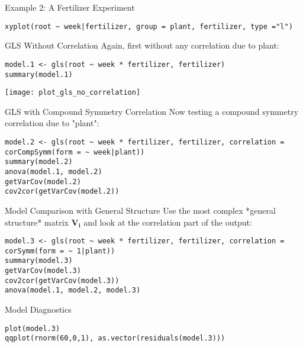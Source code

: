 \documentclass{beamer}
\begin{document}
\begin{frame}[fragile]{Example 2: A Fertilizer Experiment}
  \begin{verbatim}
xyplot(root ~ week|fertilizer, group = plant, fertilizer, type ="l")
  \end{verbatim}
\end{frame}

\begin{frame}[fragile]{GLS Without Correlation}
  Again, first without any correlation due to plant:
  \begin{verbatim}
model.1 <- gls(root ~ week * fertilizer, fertilizer)
summary(model.1)
  \end{verbatim}
  \begin{center}
    \texttt{[image: plot\_gls\_no\_correlation]} %
  \end{center}
\end{frame}

\begin{frame}[fragile]{GLS with Compound Symmetry Correlation}
  Now testing a compound symmetry correlation due to "plant":
  \begin{verbatim}
model.2 <- gls(root ~ week * fertilizer, fertilizer, correlation = corCompSymm(form = ~ week|plant))
summary(model.2)
anova(model.1, model.2)
getVarCov(model.2)
cov2cor(getVarCov(model.2))
  \end{verbatim}
\end{frame}

\begin{frame}[fragile]{Model Comparison with General Structure}
  Use the most complex *general structure* matrix $\mathbf{V_i}$ and look at the correlation part of the output:
  \begin{verbatim}
model.3 <- gls(root ~ week * fertilizer, fertilizer, correlation = corSymm(form = ~ 1|plant))
summary(model.3)
getVarCov(model.3)
cov2cor(getVarCov(model.3))
anova(model.1, model.2, model.3)
  \end{verbatim}
\end{frame}

\begin{frame}[fragile]{Model Diagnostics}
  \begin{verbatim}
plot(model.3)
qqplot(rnorm(60,0,1), as.vector(residuals(model.3)))
  \end{verbatim}
\end{frame}
\end{document}
